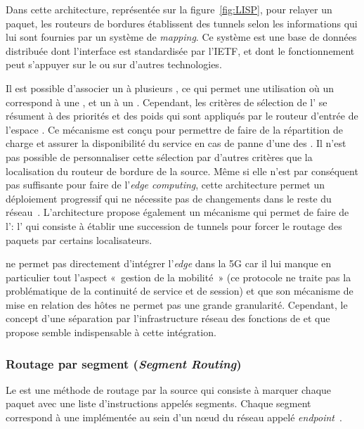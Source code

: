 \documentclass[../main.tex]{subfiles}
\begin{document}
Dans cette architecture, représentée sur la figure~\ref{fig:LISP}, pour relayer un paquet, les routeurs de bordures établissent des tunnels selon les informations qui lui sont fournies par un système de \textit{mapping}.
Ce système est une base de données distribuée dont l’interface est standardisée par l’IETF, et dont le fonctionnement peut s’appuyer sur le  ou sur d’autres technologies. 

Il est possible d’associer un  à plusieurs , ce qui permet une utilisation où un  correspond à une , et un  à un .
Cependant, les critères de sélection de l’ se résument à des priorités et des poids qui sont appliqués par le routeur d’entrée de l’espace .
Ce mécanisme est conçu pour permettre de faire de la répartition de charge et assurer la disponibilité du service en cas de panne d’une des .
Il n’est pas possible de personnaliser cette sélection par d’autres critères que la localisation du routeur de bordure de la source.
Même si elle n’est par conséquent pas suffisante pour faire de l’\textit{edge computing}, cette architecture permet un déploiement progressif qui ne nécessite pas de changements dans le reste du réseau~\cite{10.1109/COMST.2017.2728478}.
L’architecture propose également un mécanisme qui permet de faire de l’: l’ qui consiste à établir une succession de tunnels pour forcer le routage des paquets par certains localisateurs.

 ne permet pas directement d’intégrer l’\textit{edge} dans la 5G car il lui manque en particulier tout l’aspect « gestion de la mobilité » (ce protocole ne traite pas la problématique de la continuité de service et de session) et que son mécanisme de mise en relation des hôtes ne permet pas une grande granularité.
Cependant, le concept d’une séparation par l’infrastructure réseau des fonctions de  et  que  propose semble indispensable à cette intégration.

\subsubsection{Routage par segment (\textit{Segment Routing})}
\label{sec:segment-routing}
Le  est une méthode de routage par la source qui consiste à marquer chaque paquet avec une liste d'instructions appelés segments. Chaque segment correspond à une  implémentée au sein d’un nœud du réseau appelé \textit{endpoint}~\cite{rfc9256}.
\end{document}
